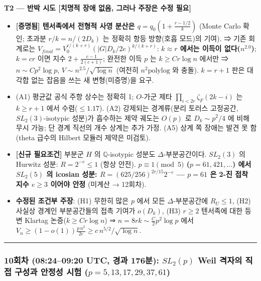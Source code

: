 \textbf{T2 --- 반박 시도 {[}치명적 장애 없음, 그러나 주장은 수정 필요{]}}

\begin{itemize}
\tightlist
\item
  \textbf{{[}증명됨{]} 텐서족에서 전형적 사영 분산은 \(q=q_0(1+\tfrac{r-1/2}{k})\)} (Monte Carlo 확인; 초과분 \(r/k=n/(2D_k)\) 는 정확히 항등 방향(호흡 모드)의 기여). ⇒ 기존 회계로는 \(V_{final}=V_0^{r/(k+r)}(|G|D_k/2e)^{k/(k+r)}\): \textbf{\(k\approx r\) 에서는 이득이 없다(\(n^{2.0}\))}; \(k=cr\) 이면 지수 \(2+\tfrac{c-1}{2(c+1)}\); 완전한 이득 \(p\) 는 \(k\ge Cr\log n\) 에서만 ⇒ \(n\sim Cp^2\log p\), \(V\sim n^{2.5}/\sqrt{\log n}\) (여전히 \(n^2\mathrm{polylog}\) 와 충돌). \(k=r+1\) 판은 대각합 없는 잡음을 쓰는 새 변형(미증명)을 요구.
\item
  (A1) 평균값 공식 주항 상수는 정확히 1; \(O\)-가군 제타 \(\prod_{i<2r}\zeta_F(2k-i)\) 는 \(k\ge r+1\) 에서 수렴(\(\le1.17\)). (A2) 강제되는 경계류(분리 토러스 고정공간, \(SL_2(3)\)-isotypic 성분)가 흡수하는 제약 궤도는 \(O(p)\) 로 \(D_k\sim p^2/4\) 에 비해 무시 가능; 단 경계 직선의 개수 상계는 추가 가정. (A5) 상계 쪽 장애는 발견 못 함(theta 급수의 Hilbert 모듈러 제약은 미검토).
\item
  \textbf{{[}신규 필요조건{]}} 부분군 \(H\) 의 \(\mathbb Q\)-isotypic 성분도 \(\Delta\)-부분공간이다. \(SL_2(3)\) 의 Hurwitz 성분: \(R=2^{-e}\le1\) (항상 안전). \textbf{\(p\equiv1\pmod5\) (\(p=61,421,\dots\)) 에서 \(SL_2(5)\) 의 icosian 성분: \(R=(625/256)^{2r/15}2^{-e}\) --- \(p=61\) 은 2-진 접착 지수 \(e\ge3\) 이어야 안정} (미계산 → 12회차).
\item
  \textbf{수정된 조건부 주장}: (H1) 무한히 많은 \(p\) 에서 모든 \(\Delta\)-부분공간에 \(R_U\le1\), (H2) 사실상 경계인 부분공간들의 접촉 기여가 \(o(D_k)\), (H3) \(r\ge2\) 텐서족에 대한 등변 Klartag 논증(\(k\ge Cr\log n\)) ⇒ \(n=8rk\sim\tfrac C2p^2\log p\) 에서 \(V_n\ge(1-o(1))\tfrac{p\,n^2}{2e}\ge c\,n^{5/2}/\sqrt{\log n}\).
\end{itemize}

\begin{center}\rule{0.5\linewidth}{0.5pt}\end{center}

\hypertarget{uxd68cuxcc28-08240920-utc-uxacbduxacfc-176uxbd84-sl_2p-weil-uxaca9uxc790uxc758-uxc9c1uxc811-uxad6cuxc131uxacfc-uxc548uxc815uxc131-uxc2dcuxd5d8-p51317293761}{%
\subsubsection*{\texorpdfstring{10회차 (08:24--09:20 UTC, 경과 176분): \(SL_2(p)\) Weil 격자의 직접 구성과 안정성 시험 (\(p=5,13,17,29,37,61\))}{10회차 (08:24--09:20 UTC, 경과 176분): SL\_2(p) Weil 격자의 직접 구성과 안정성 시험 (p=5,13,17,29,37,61)}}\label{uxd68cuxcc28-08240920-utc-uxacbduxacfc-176uxbd84-sl_2p-weil-uxaca9uxc790uxc758-uxc9c1uxc811-uxad6cuxc131uxacfc-uxc548uxc815uxc131-uxc2dcuxd5d8-p51317293761}}

